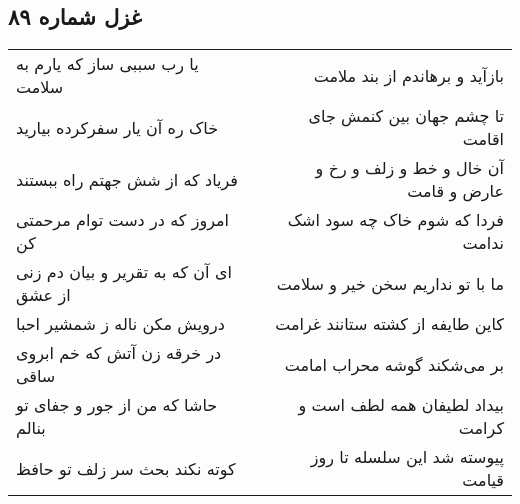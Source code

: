 \begin{center}
\section*{غزل شماره ۸۹}
\label{sec:sh089}
\begin{longtable}{l p{0.5cm} r}
یا رب سببی ساز که یارم به سلامت
&&
بازآید و برهاندم از بند ملامت
\\
خاک ره آن یار سفرکرده بیارید
&&
تا چشم جهان بین کنمش جای اقامت
\\
فریاد که از شش جهتم راه ببستند
&&
آن خال و خط و زلف و رخ و عارض و قامت
\\
امروز که در دست توام مرحمتی کن
&&
فردا که شوم خاک چه سود اشک ندامت
\\
ای آن که به تقریر و بیان دم زنی از عشق
&&
ما با تو نداریم سخن خیر و سلامت
\\
درویش مکن ناله ز شمشیر احبا
&&
کاین طایفه از کشته ستانند غرامت
\\
در خرقه زن آتش که خم ابروی ساقی
&&
بر می‌شکند گوشه محراب امامت
\\
حاشا که من از جور و جفای تو بنالم
&&
بیداد لطیفان همه لطف است و کرامت
\\
کوته نکند بحث سر زلف تو حافظ
&&
پیوسته شد این سلسله تا روز قیامت
\\
\end{longtable}
\end{center}
